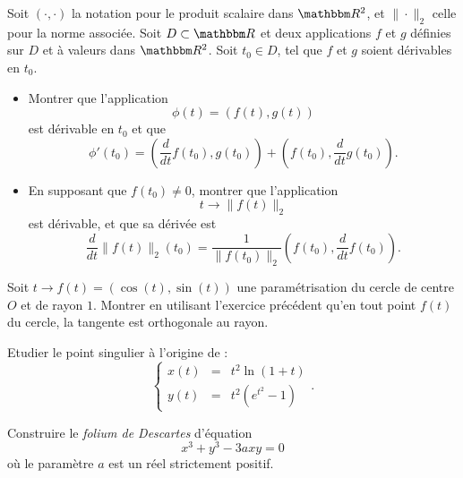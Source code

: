 \begin{exercice}

Soit $(\cdot,\cdot)$ la notation pour le produit scalaire dans $\eR^2$, et $\| \cdot \|_2$ celle pour la norme associée.
Soit $D \subset \eR$ et deux applications $f$ et $g$ définies sur $D$ et à valeurs dans $\eR^2$. Soit $t_0 \in D$, tel que $f$ et $g$ soient dérivables en $t_0$.

\begin{itemize}

\item Montrer que l'application 
\[
\phi(t) = ( f(t) , g(t) )
\]
est dérivable en $t_0$ et que 
\[
\phi'(t_0) = \left ( \frac{d}{dt} f(t_0) , g(t_0) \right ) + \left ( f(t_0) , \frac{d}{dt}g(t_0) \right ).
\]

\item En supposant que $f(t_0) \neq 0$, montrer que l'application
\[
t \rightarrow  \| f(t) \|_2
\]
est dérivable, et que sa dérivée est
\[
\frac{d}{dt} \| f(t) \|_2 (t_0) = \frac{1}{\| f(t_0) \|_2} 
\left ( f(t_0) , \frac{d}{dt} f(t_0) \right ) .
\]

\end{itemize}

\end{exercice}

\medskip

\begin{exercice}

Soit $t \rightarrow f(t)=( \cos(t) , \sin(t) )$ une paramétrisation du cercle de centre $O$ et de rayon $1$. Montrer en utilisant l'exercice précédent qu'en tout point $f(t)$ du cercle, la tangente est orthogonale au rayon.

\end{exercice}

\medskip

\begin{exercice}

Etudier le point singulier à l'origine de :
\[
\left \{
\begin{array}{lcl}
x(t) & = & t^2 \ln(1+t) \\
y(t) & = & t^2 (e^{t^2} - 1)
\end{array}
\right . .
\]

\end{exercice}

\medskip

\begin{exercice}

Construire le \emph{folium de Descartes} d'équation
\[
x^3 + y^3 - 3 a x y = 0
\]
où le paramètre $a$ est un réel strictement positif.

\end{exercice}



